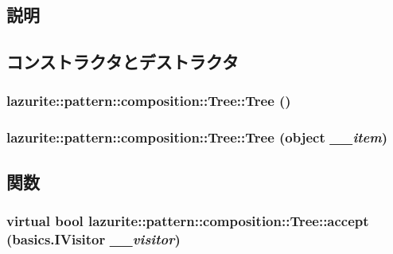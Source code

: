 \subsection{説明}


\subsection{コンストラクタとデストラクタ}
\hypertarget{classlazurite_1_1pattern_1_1composition_1_1_tree_a99080f57f88e1268cee7413a699aa29b}{
\subsubsection[{Tree}]{\setlength{\rightskip}{0pt plus 5cm}lazurite::pattern::composition::Tree::Tree ()}}
\label{classlazurite_1_1pattern_1_1composition_1_1_tree_a99080f57f88e1268cee7413a699aa29b}
\hypertarget{classlazurite_1_1pattern_1_1composition_1_1_tree_a8a891cc4b517eda9efd02670df3c9343}{
\subsubsection[{Tree}]{\setlength{\rightskip}{0pt plus 5cm}lazurite::pattern::composition::Tree::Tree (object {\em \_\-\_\-item})}}
\label{classlazurite_1_1pattern_1_1composition_1_1_tree_a8a891cc4b517eda9efd02670df3c9343}


\subsection{関数}
\hypertarget{classlazurite_1_1pattern_1_1composition_1_1_tree_ad31584f25c465eea5b1c294e50f805a7}{
\subsubsection[{accept}]{\setlength{\rightskip}{0pt plus 5cm}virtual bool lazurite::pattern::composition::Tree::accept ({\bf basics.IVisitor} {\em \_\-\_\-visitor})}}
\label{classlazurite_1_1pattern_1_1composition_1_1_tree_ad31584f25c465eea5b1c294e50f805a7}

